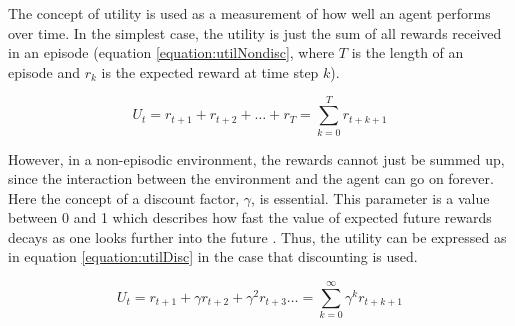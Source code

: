 The concept of utility is used as a measurement of how well an agent performs
over time. In the simplest case, the utility is just the sum of all rewards
received in an episode (equation \eqref{equation:utilNondisc}, where $T$ is the
length of an episode and $r_k$ is the expected reward at time step $k$).

\begin{equation}
\label{equation:utilNondisc}
U_t = r_{t+1} + r_{t+2} + \dots + r_{T}
  = \sum\limits_{k = 0}^{T} r_{t+k+1}
\end{equation}

However, in a non-episodic environment, the rewards cannot just be summed up,
since the interaction between the environment and the agent can go on forever.
Here the concept of a discount factor, $\gamma$, is essential. This parameter
is a value between 0 and 1 which describes how fast the value of expected
future rewards decays as one looks further into the future
\parencite{barto1998reinforcement}. Thus, the utility can be expressed as in
equation \eqref{equation:utilDisc} in the case that discounting is used. 

\begin{equation}
\label{equation:utilDisc}
U_{t} = r_{t + 1} + \gamma r_{t + 2} + \gamma^2 r_{t + 3} \dots
  =  \sum\limits_{k = 0}^\infty \gamma^kr_{t+k+1}
\end{equation}






